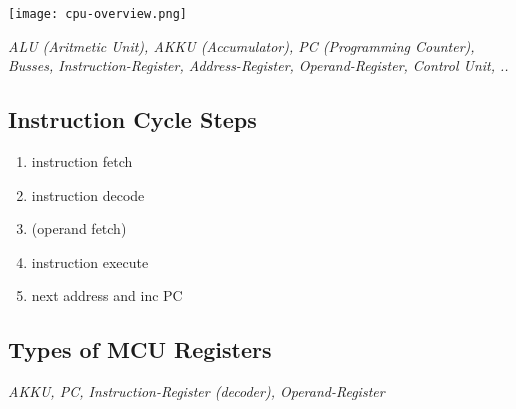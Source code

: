 \texttt{[image: cpu-overview.png]}

\textit{
    ALU (Aritmetic Unit), AKKU (Accumulator), PC (Programming Counter),
    Busses, Instruction-Register, Address-Register,
    Operand-Register, Control Unit, ..
}

\subsection{Instruction Cycle Steps}

\begin{enumerate}
    \item{instruction fetch}
    \item{instruction decode}
    \item{(operand fetch)}
    \item{instruction execute}
    \item{next address and inc PC}
\end{enumerate}

\subsection{Types of MCU Registers}

\textit{
    AKKU, PC, Instruction-Register (decoder), Operand-Register
}
